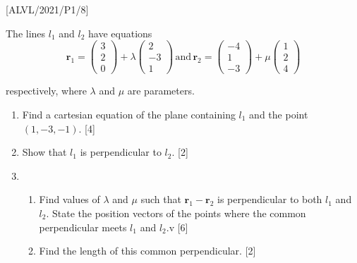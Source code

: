 \item {[}ALVL/2021/P1/8{]}

The lines $l_{1}$ and $l_{2}$ have equations 
\[
\boldsymbol{r}_{1}=\left(\begin{array}{c}
3\\
2\\
0
\end{array}\right)+\lambda\left(\begin{array}{c}
2\\
-3\\
1
\end{array}\right)\,\text{and}\,\boldsymbol{r}_{2}=\left(\begin{array}{c}
-4\\
1\\
-3
\end{array}\right)+\mu\left(\begin{array}{c}
1\\
2\\
4
\end{array}\right)
\]

respectively, where $\lambda$ and $\mu$ are parameters. 
\begin{enumerate}
\item Find a cartesian equation of the plane containing $l_{1}$ and the
point $\left(1,-3,-1\right)$. \hfill{}{[}4{]}
\item Show that $l_{1}$ is perpendicular to $l_{2}$.\hfill{} {[}2{]}
\item {}
\begin{enumerate}
\item Find values of $\lambda$ and $\mu$ such that $\boldsymbol{r}_{1}-\boldsymbol{r}_{2}$
is perpendicular to both $l_{1}$ and $l_{2}$. State the position
vectors of the points where the common perpendicular meets $l_{1}$
and $l_{2}$.v {[}6{]} 
\item Find the length of this common perpendicular.\hfill{} {[}2{]}
\end{enumerate}
\end{enumerate}
